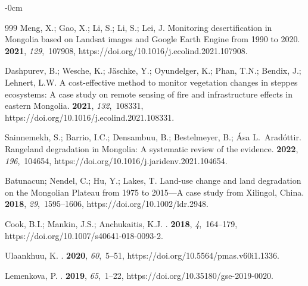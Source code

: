 \documentclass[geosciences,article,accept,pdftex,oneauthor]{Definitions/mdpi}
\begin{document}
\begin{adjustwidth}{-\extralength}{0cm}
\begin{thebibliography}{999}
Meng, X.; Gao, X.; Li, S.; Li, S.; Lei, J.
\newblock Monitoring desertification in Mongolia based on Landsat images and
  Google Earth Engine from 1990 to 2020.
 {\bf 2021}, {\em 129},~107908, https://doi.org/10.1016/j.ecolind.2021.107908.

Dashpurev, B.; Wesche, K.; Jäschke, Y.; Oyundelger, K.; Phan, T.N.; Bendix,
  J.; Lehnert, L.W.
\newblock A cost-effective method to monitor vegetation changes in steppes
  ecosystems: A case study on remote sensing of fire and infrastructure effects
  in eastern Mongolia.
 {\bf 2021}, {\em 132},~108331, https://doi.org/10.1016/j.ecolind.2021.108331.

Sainnemekh, S.; Barrio, I.C.; Densambuu, B.; Bestelmeyer, B.; Ása
  L.~Aradóttir.
\newblock Rangeland degradation in Mongolia: A systematic review of the
  evidence.
 {\bf 2022}, {\em 196},~104654, https://doi.org/10.1016/j.jaridenv.2021.104654.

Batunacun; Nendel, C.; Hu, Y.; Lakes, T.
\newblock Land-use change and land degradation on the Mongolian Plateau from
  1975 to 2015—A case study from Xilingol, China.
 {\bf 2018}, {\em
  29},~1595--1606, https://doi.org/10.1002/ldr.2948.

Cook, B.I.; Mankin, J.S.; Anchukaitis, K.J.
.
 {\bf 2018}, {\em 4},~164--179, https://doi.org/10.1007/s40641-018-0093-2.

Ulaankhuu, K.
.
 {\bf 2020},
  {\em 60},~5–51, https://doi.org/10.5564/pmas.v60i1.1336.

Lemenkova, P.
.
 {\bf 2019}, {\em 65},~1--22, https://doi.org/10.35180/gse-2019-0020.


\end{thebibliography}
\end{adjustwidth}
\end{document}
